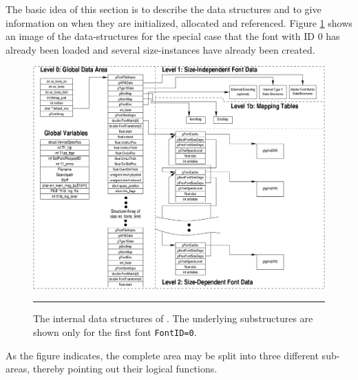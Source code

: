 The basic idea of this section is to describe the data structures and to give
information on when they are initialized, allocated and referenced. Figure
\ref{figure:t1data} shows an image of the data-structures for the special case that
the font with ID 0 has already been loaded and several size-instances have
already been created. 
\begin{figure}
\begin{center}
\includegraphics*[angle=90]{t1_data}
\end{center}
\hrule\vskip3mm\small
\caption{\label{figure:t1data}The internal data structures of \tonelib. The
underlying substructures are shown only for the first font
{\tt FontID=0}.} 
\end{figure}
As the figure indicates, the complete area may be split into three
different sub-areas, thereby pointing out their logical functions.

